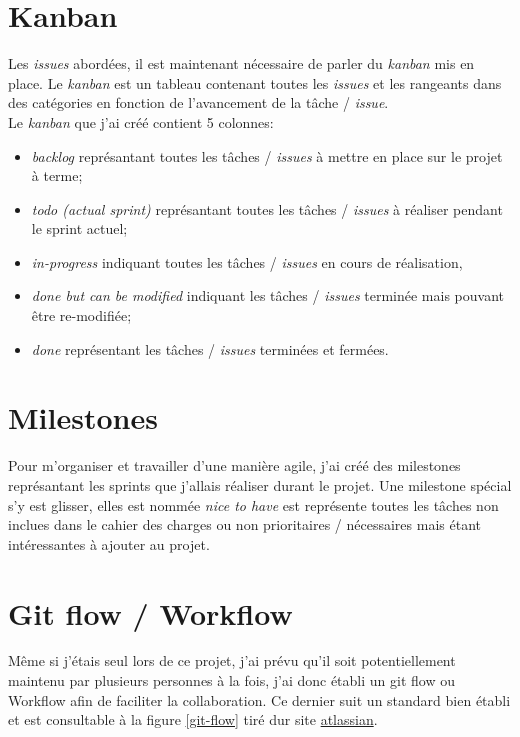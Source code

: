 \documentclass[
    iai, %
    il, %
]{heig-tb}
\begin{document}
\section{Kanban}
Les \emph{issues} abordées, il est maintenant nécessaire de parler du \emph{kanban} mis en place. Le \emph{kanban} est un tableau contenant toutes les \emph{issues} et les rangeants dans des catégories en fonction de l'avancement de la tâche / \emph{issue}. \\
Le \emph{kanban} que j'ai créé contient 5 colonnes:
\begin{itemize}
    \item \emph{backlog} représantant toutes les tâches / \emph{issues} à mettre en place sur le projet à terme;
    \item \emph{todo (actual sprint)} représantant toutes les tâches / \emph{issues} à réaliser pendant le sprint actuel;
    \item \emph{in-progress} indiquant toutes les tâches / \emph{issues} en cours de réalisation,
    \item \emph{done but can be modified} indiquant les tâches / \emph{issues} terminée mais pouvant être re-modifiée;
    \item \emph{done} représentant les tâches / \emph{issues} terminées et fermées.
\end{itemize}

\section{Milestones}
Pour m'organiser et travailler d'une manière agile, j'ai créé des milestones représantant les sprints que j'allais réaliser durant le projet. Une milestone spécial s'y est glisser, elles est nommée \emph{nice to have} est représente toutes les tâches non inclues dans le cahier des charges ou non prioritaires / nécessaires mais étant intéressantes à ajouter au projet.

\section{Git flow / Workflow}
Même si j'étais seul lors de ce projet, j'ai prévu qu'il soit potentiellement maintenu par plusieurs personnes à la fois, j'ai donc établi un \Gls{git} flow ou Workflow afin de faciliter la collaboration. Ce dernier suit un standard bien établi et est consultable à la figure
\ref{git-flow} tiré dur site \href{https://www.atlassian.com/fr/git/tutorials/comparing-workflows/.gitflow-workflow}{atlassian}.
\end{document}
